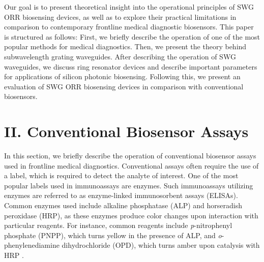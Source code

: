 \documentclass[aps,prl,twocolumn, superscriptaddress,nobalancelastpage]{revtex4}
\begin{document}
Our goal is to present theoretical insight into the operational principles of SWG ORR biosensing devices, as well as to explore their practical limitations in comparison to contemporary frontline medical diagnostic biosensors. This paper is structured as follows: First, we briefly describe the operation of one of the most popular methods for medical diagnostics. Then, we present the theory behind subwavelength grating waveguides. After describing the operation of SWG waveguides, we discuss ring resonator devices and describe important parameters for applications of silicon photonic biosensing. Following this, we present an evaluation of SWG ORR biosensing devices in comparison with conventional biosensors.

\vspace{-1em}
\section{II. Conventional Biosensor Assays}
\vspace{-1em}

In this section, we briefly describe the operation of conventional biosensor assays used in frontline medical diagnostics. Conventional assays often require the use of a label, which is required to detect the analyte of interest. One of the most popular labels used in immunoassays are enzymes. Such immunoassays utilizing enzymes are referred to as enzyme-linked immunosorbent assays (ELISAs). Common enzymes used include alkaline phosphatase (ALP) and horseradish peroxidase (HRP), as these enzymes produce color changes upon interaction with particular reagents. For instance, common reagents include \textit{p}-nitrophenyl phosphate (PNPP), which turns yellow in the presence of ALP, and \textit{o}-phenylenediamine dihydrochloride (OPD),  which turns amber upon catalysis with HRP \cite{thermofisher}. 
\end{document}
